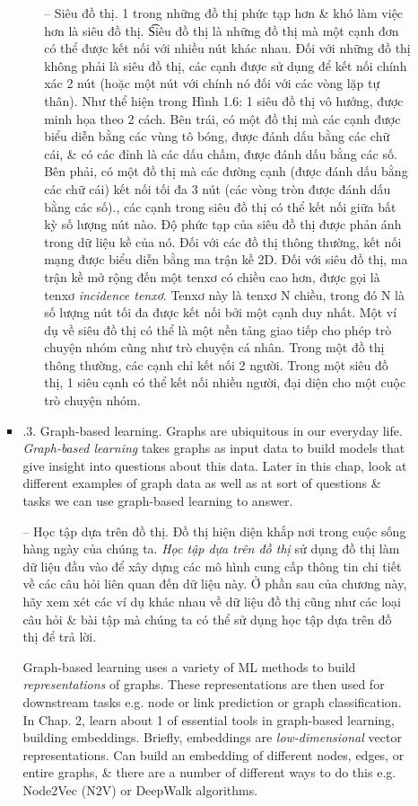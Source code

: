 \documentclass{article}
\begin{document}
\begin{itemize}
\begin{itemize}
\begin{itemize}
\begin{itemize}
                -- {\sf Siêu đồ thị.} 1 trong những đồ thị phức tạp hơn \& khó làm việc hơn là siêu đồ thị. {\t Siêu đồ thị} là những đồ thị mà một cạnh đơn có thể được kết nối với nhiều nút khác nhau. Đối với những đồ thị không phải là siêu đồ thị, các cạnh được sử dụng để kết nối chính xác 2 nút (hoặc một nút với chính nó đối với các vòng lặp tự thân). Như thể hiện trong {\sf Hình 1.6: 1 siêu đồ thị vô hướng, được minh họa theo 2 cách. Bên trái, có một đồ thị mà các cạnh được biểu diễn bằng các vùng tô bóng, được đánh dấu bằng các chữ cái, \& có các đỉnh là các dấu chấm, được đánh dấu bằng các số. Bên phải, có một đồ thị mà các đường cạnh (được đánh dấu bằng các chữ cái) kết nối tối đa 3 nút (các vòng tròn được đánh dấu bằng các số).}, các cạnh trong siêu đồ thị có thể kết nối giữa bất kỳ số lượng nút nào. Độ phức tạp của siêu đồ thị được phản ánh trong dữ liệu kề của nó. Đối với các đồ thị thông thường, kết nối mạng được biểu diễn bằng ma trận kề 2D. Đối với siêu đồ thị, ma trận kề mở rộng đến một tenxơ có chiều cao hơn, được gọi là tenxơ {\it incidence tenxơ}. Tenxơ này là tenxơ N chiều, trong đó N là số lượng nút tối đa được kết nối bởi một cạnh duy nhất. Một ví dụ về siêu đồ thị có thể là một nền tảng giao tiếp cho phép trò chuyện nhóm cũng như trò chuyện cá nhân. Trong một đồ thị thông thường, các cạnh chỉ kết nối 2 người. Trong một siêu đồ thị, 1 siêu cạnh có thể kết nối nhiều người, đại diện cho một cuộc trò chuyện nhóm.
            \end{itemize}
            \item {.3. Graph-based learning.} Graphs are ubiquitous in our everyday life. {\it Graph-based learning} takes graphs as input data to build models that give insight into questions about this data. Later in this chap, look at different examples of graph data as well as at sort of questions \& tasks we can use graph-based learning to answer.

            -- {\sf Học tập dựa trên đồ thị.} Đồ thị hiện diện khắp nơi trong cuộc sống hàng ngày của chúng ta. {\it Học tập dựa trên đồ thị} sử dụng đồ thị làm dữ liệu đầu vào để xây dựng các mô hình cung cấp thông tin chi tiết về các câu hỏi liên quan đến dữ liệu này. Ở phần sau của chương này, hãy xem xét các ví dụ khác nhau về dữ liệu đồ thị cũng như các loại câu hỏi \& bài tập mà chúng ta có thể sử dụng học tập dựa trên đồ thị để trả lời.

            Graph-based learning uses a variety of ML methods to build {\it representations} of graphs. These representations are then used for downstream tasks e.g. node or link prediction or graph classification. In Chap. 2, learn about 1 of essential tools in graph-based learning, building embeddings. Briefly, embeddings are {\it low-dimensional} vector representations. Can build an embedding of different nodes, edges, or entire graphs, \& there are a number of different ways to do this e.g. Node2Vec (N2V) or DeepWalk algorithms.


\end{itemize}
\end{itemize}
\end{itemize}
\end{document}
